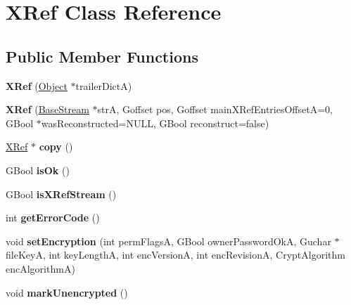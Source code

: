 \hypertarget{class_x_ref}{}\section{X\+Ref Class Reference}
\label{class_x_ref}
\subsection*{Public Member Functions}
\begin{DoxyCompactItemize}
\item 
\mbox{\label{class_x_ref_a55266390a40bd42462d75dca6c067abd}} 
{\bfseries X\+Ref} (\hyperlink{class_object}{Object} $\ast$trailer\+DictA)
\item 
\mbox{\label{class_x_ref_ad9934432d79c610ae272225a901a772d}} 
{\bfseries X\+Ref} (\hyperlink{class_base_stream}{Base\+Stream} $\ast$strA, Goffset pos, Goffset main\+X\+Ref\+Entries\+OffsetA=0, G\+Bool $\ast$was\+Reconstructed=N\+U\+LL, G\+Bool reconstruct=false)
\item 
\mbox{\label{class_x_ref_a9102c80cfedac4adda06de28a8172036}} 
\hyperlink{class_x_ref}{X\+Ref} $\ast$ {\bfseries copy} ()
\item 
\mbox{\label{class_x_ref_a7e403b356bc97c2327e634059b5cef55}} 
G\+Bool {\bfseries is\+Ok} ()
\item 
\mbox{\label{class_x_ref_a85ace6fd684b2835fefd4aa294edfc12}} 
G\+Bool {\bfseries is\+X\+Ref\+Stream} ()
\item 
\mbox{\label{class_x_ref_aae1e6a389b69be6ce5aee9259cc741dd}} 
int {\bfseries get\+Error\+Code} ()
\item 
\mbox{\label{class_x_ref_a7f4142a499444a1111d1e9ff97af6014}} 
void {\bfseries set\+Encryption} (int perm\+FlagsA, G\+Bool owner\+Password\+OkA, Guchar $\ast$file\+KeyA, int key\+LengthA, int enc\+VersionA, int enc\+RevisionA, Crypt\+Algorithm enc\+AlgorithmA)
\item 
\mbox{\label{class_x_ref_a3463b1822eb4ef55c96a710bdad92650}} 
void {\bfseries mark\+Unencrypted} ()
\item 
\mbox{\label{class_x_ref_a335fa8558e0a2a3cc8eed5b680e6c32e}} 

\end{DoxyCompactItemize}
